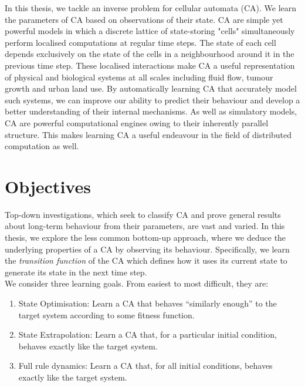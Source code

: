 In this thesis, we tackle an inverse problem for cellular automata (CA). We learn the parameters of CA based on observations of their state. CA are simple yet powerful models in which a discrete lattice of state-storing "cells" simultaneously perform localised computations at regular time steps. The state of each cell depends exclusively on the state of the cells in a neighbourhood around it in the previous time step. These localised interactions make CA a useful representation of physical and biological systems at all scales including fluid flow\cite{wolf2004lattice}, tumour growth\cite{deutsch2021bio, reher2017cell} and urban land use\cite{white2000high}. By automatically learning CA that accurately model such systems, we can improve our ability to predict their behaviour and develop a better understanding of their internal mechanisms. As well as simulatory models, CA are powerful computational engines owing to their inherently parallel structure. This makes learning CA a useful endeavour in the field of distributed computation as well\cite{tosic2005cellular}.\\


\section{Objectives}

Top-down investigations, which seek to classify CA and prove general results about long-term behaviour from their parameters, are vast and varied\cite{packard1985two, wolfram2002,eppstein2010growth}. In this thesis, we explore the less common bottom-up approach, where we deduce the underlying properties of a CA by observing its behaviour. Specifically, we learn the \textit{transition function} of the CA which defines how it uses its current state to generate its state in the next time step.\\

We consider three learning goals. From easiest to most difficult, they are:
\begin{enumerate}
    \item State Optimisation: Learn a CA that behaves ``similarly enough'' to the target system according to some fitness function. 
    \item State Extrapolation: Learn a CA that, for a particular initial condition, behaves exactly like the target system.
    \item Full rule dynamics: Learn a CA that, for all initial conditions, behaves exactly like the target system.
\end{enumerate}

